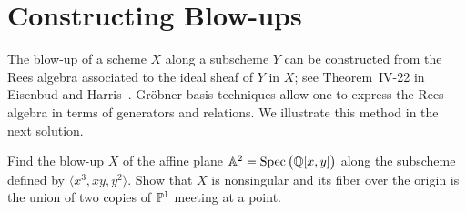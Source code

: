 \section{Constructing Blow-ups}

The blow-up of a scheme $X$ along a subscheme $Y$ can
be constructed from the Rees algebra associated to
the ideal sheaf of $Y$ in $X$; see Theorem~IV-22 in Eisenbud and
Harris~\cite{SC:EH}.  Gr\"{o}bner basis techniques allow one to
express the Rees algebra in terms of generators and relations.  We
illustrate this method in the next solution.

\begin{problem*}
Find the blow-up $X$ of the affine plane
$\mathbb{A}^{2} = \operatorname{Spec}\big( {\mathbb Q}[x, y] \big)$ along the subscheme
defined by $\langle x^{3}, xy, y^{2} \rangle$.  Show that $X$ is
nonsingular and its fiber over the origin is the union of two copies
of ${\mathbb P}^{1}$ meeting at a point.
\end{problem*}

